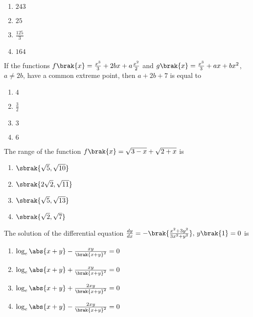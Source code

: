 \begin{multicols}{4}    
\begin{enumerate}
    \item $243$
    \item $25$
    \item $\frac{125}{3}$
    \item $164$
\end{enumerate}
\end{multicols}


\item If the functions $f\brak{x} = \frac{x^3}{3} + 2bx + a\frac{x^2}{2} $ and $g\brak{x} = \frac{x^3}{3} + ax + bx^2$, $a \neq 2b$, have a common extreme point, then $a + 2b + 7$ is equal to   \hfill {}

\begin{multicols}{4}
\begin{enumerate}
    \item $4$
    \item $\frac{3}{2}$
    \item $3$
    \item $6$
\end{enumerate}
\end{multicols}

\item The range of the function $f\brak{x} = \sqrt{3 - x} + \sqrt{2 + x}$ is  \hfill {}

\begin{multicols}{4}
\begin{enumerate}
    \item $\sbrak{\sqrt{5}, \sqrt{10}}$
    \item $\sbrak{2\sqrt{2}, \sqrt{11}}$
    \item $\sbrak{\sqrt{5}, \sqrt{13}}$
    \item $\sbrak{\sqrt{2}, \sqrt{7}}$
\end{enumerate}
\end{multicols}

\item The solution of the differential equation $ \frac{dy}{dx} = -\brak{\frac{x^2 + 3y^2}{3x^2 + y^2}}, \, y\brak{1} = 0$  is   \hfill {}

\begin{multicols}{2}
\begin{enumerate}
    \item $\log_e \abs{ x + y } - \frac{xy}{\brak{ x + y }^2} = 0$
    \item $\log_e \abs{ x + y } + \frac{xy}{\brak{ x + y }^2} = 0$
    \item $\log_e \abs{ x + y } + \frac{2xy}{\brak{ x + y }^2} = 0$
    \item $\log_e \abs{ x + y } - \frac{2xy}{\brak{ x + y }^2} = 0$
\end{enumerate}
\end{multicols}

